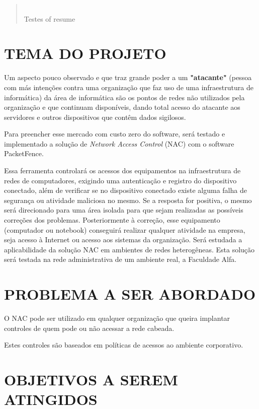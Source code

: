\documentclass[brazil, ruledheader, pnumromarab,normaltoc]{abnt}
\begin{document}
\begin{abstract}
$\phantom{linha em branco}$\\
Testes of resume
\end{abstract} 

\chapter{TEMA DO PROJETO}
Um aspecto pouco observado e que traz grande poder a um \textbf{"atacante"} (pessoa com más intenções contra uma organização que faz uso de uma infraestrutura de informática) da área de informática são os pontos de redes não utilizados pela organização e que continuam disponíveis, dando total acesso do atacante aos servidores e outros dispositivos que contêm dados sigilosos.
\par
Para preencher esse mercado com custo zero do software, será testado e implementado a solução de \textit{Network Access Control} (NAC) com o software PacketFence.
\par
Essa ferramenta controlará os acessos dos equipamentos na infraestrutura de redes de computadores, exigindo uma autenticação e registro do dispositivo conectado, além de verificar se no dispositivo conectado existe alguma falha de segurança ou atividade maliciosa no mesmo. Se a resposta for positiva, o mesmo será direcionado para uma área isolada para que sejam realizadas as possíveis correções dos problemas. Posteriormente à correção, esse equipamento (computador ou notebook) conseguirá realizar qualquer atividade na empresa, seja acesso à Internet ou acesso aos sistemas da organização.
Será estudada a aplicabilidade da solução NAC em ambientes de redes heterogêneas. Esta solução será testada na rede administrativa de um ambiente real, a Faculdade Alfa.

\chapter{PROBLEMA A SER ABORDADO}
O NAC pode ser utilizado em qualquer organização que queira implantar controles de quem pode ou não acessar a rede cabeada.
\par
Estes controles são baseados em políticas de acessos ao ambiente corporativo.

\chapter{OBJETIVOS A SEREM ATINGIDOS}
\end{document}
